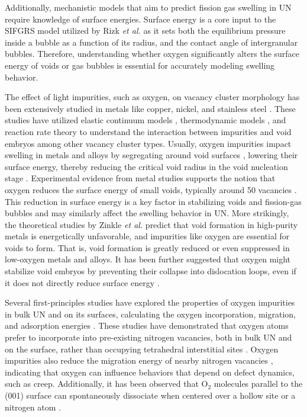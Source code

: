 \documentclass[preprint,12pt,sort&compress]{elsarticle}
\newcommand{\?}{\stackrel{?}{=}}
\providecommand{\DIFaddtex}[1]{{\bf #1}} %
\providecommand{\DIFaddbegin}{\protect\color{blue}} %
\providecommand{\DIFaddend}{\protect\color{black}} %
\providecommand{\DIFadd}[1]{\texorpdfstring{\DIFaddtex{#1}}{#1}} %
\newcommand{\DIFaddincludegraphics}[2][]{{\color{blue}\fbox{\DIFOincludegraphics[#1]{#2}}}} %
\DeclareRobustCommand{\DIFaddbegin}{\DIFOaddbegin \let\includegraphics\DIFaddincludegraphics} %
\DeclareRobustCommand{\DIFaddend}{\DIFOaddend \let\includegraphics\DIFOincludegraphics} %
\begin{document}
Additionally, mechanistic models that aim to predict fission gas swelling in UN require knowledge of surface energies. Surface energy is a core input to the SIFGRS model utilized by Rizk \textit{et al.} \cite{Rizk2025} as it sets both the equilibrium pressure inside a bubble as a function of its radius, and the contact angle of intergranular bubbles. Therefore, understanding whether oxygen significantly alters the surface energy of voids or gas bubbles is essential for accurately modeling swelling behavior.

The effect of light impurities, such as oxygen, on vacancy cluster morphology has been extensively studied in metals like copper, nickel, and stainless steel \cite{Zinkle1987a, Zinkle1987b, Zinkle1990, Igata1998}. These studies have utilized elastic continuum models \cite{Zinkle1987a, Zinkle1987b}, thermodynamic models \cite{Zinkle1990}, and reaction rate theory \cite{Igata1998} to understand the interaction between impurities and void embryos among other vacancy cluster types. Usually, oxygen impurities impact swelling in metals and alloys by segregating around void surfaces \DIFaddbegin \DIFadd{\cite{McLean1957}}\DIFaddend , lowering their surface energy, thereby reducing the critical void radius in the void nucleation stage \cite{Zinkle1987a, Igata1998}. Experimental evidence from metal studies supports the notion that oxygen reduces the surface energy of small voids, typically around 50 vacancies \cite{Zinkle1990}. This reduction in surface energy is a key factor in stabilizing voids and fission-gas bubbles and may similarly affect the swelling behavior in UN. More strikingly, the theoretical studies by Zinkle \textit{et al.} \cite{Zinkle1987a, Zinkle1987b} predict that void formation in high-purity metals is energetically unfavorable, and impurities like oxygen are essential for voids to form. That is, void formation is greatly reduced or even suppressed in low-oxygen metals and alloys. It has been further suggested that oxygen might stabilize void embryos by preventing their collapse into dislocation loops, even if it does not directly reduce surface energy \cite{Zinkle1987b, Zinkle1990}.

Several first-principles studies have explored the properties of oxygen impurities in bulk UN and on its surfaces, calculating the oxygen incorporation, migration, and adsorption energies \cite{Kotomin2008, Kotomin2009, Zhukovskii2009JNM, Zhukovskii2009SS, Bocharov2011JNM, Bocharov2011SS, Bocharov2013, Lopes2016, Schuler2017, Zergoug2018, Sikorski2021}. These studies have demonstrated that oxygen atoms prefer to incorporate into pre-existing nitrogen vacancies, both in bulk UN and on the surface, rather than occupying tetrahedral interstitial sites \cite{Kotomin2008, Bocharov2013}. Oxygen impurities also reduce the migration energy of nearby nitrogen vacancies \cite{Kotomin2009}, indicating that oxygen can influence behaviors that depend on defect dynamics, such as creep. Additionally, it has been observed that O$_2$ molecules parallel to the (001) surface can spontaneously dissociate when centered over a hollow site or a nitrogen atom \cite{Zhukovskii2009JNM}.
\end{document}
